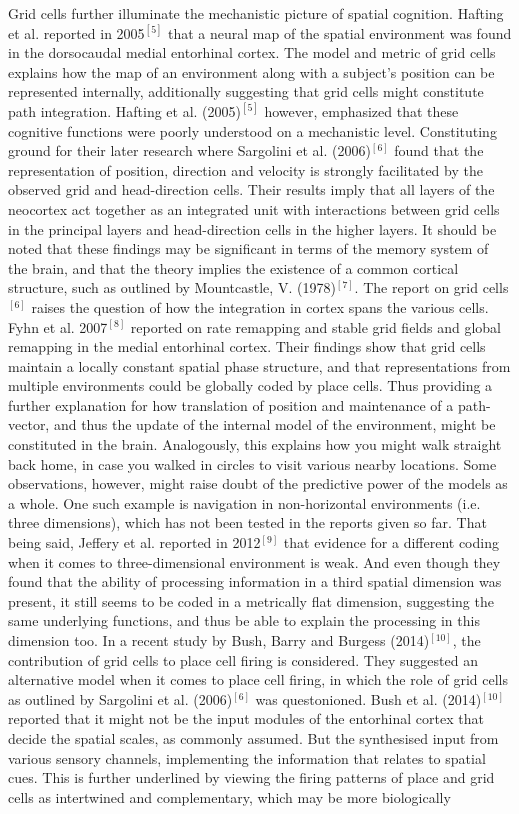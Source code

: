Grid cells further illuminate the mechanistic picture of spatial cognition. Hafting et al. reported in 2005$^{[5]}$ that a neural map of the spatial environment was found in the dorsocaudal medial entorhinal cortex. The model and metric of grid cells explains how the map of an environment along with a subject’s position can be represented internally, additionally suggesting that grid cells might constitute path integration. Hafting et al. (2005)$^{[5]}$ however, emphasized that these cognitive functions were poorly understood on a mechanistic level. Constituting ground for their later research where Sargolini et al. (2006)$^{[6]}$ found that the representation of position, direction and velocity is strongly facilitated by the observed grid and head-direction cells. Their results imply that all layers of the neocortex act together as an integrated unit with interactions between grid cells in the principal layers and head-direction cells in the higher layers. It should be noted that these findings may be significant in terms of the memory system of the brain, and that the theory implies the existence of a common cortical structure, such as outlined by Mountcastle, V. (1978)$^{[7]}$. The report on grid cells$^{[6]}$ raises the question of how the integration in cortex spans the various cells. Fyhn et al. 2007$^{[8]}$ reported on rate remapping and stable grid fields and global remapping in the medial entorhinal cortex. Their findings show that grid cells maintain a locally constant spatial phase structure, and that representations from multiple environments could be globally coded by place cells. Thus providing a further explanation for how translation of position and maintenance of a path-vector, and thus the update of the internal model of the environment, might be constituted in the brain. Analogously, this explains how you might walk straight back home, in case you walked in circles to visit various nearby locations. Some observations, however, might raise doubt of the predictive power of the models as a whole. One such example is navigation in non-horizontal environments (i.e. three dimensions), which has not been tested in the reports given so far. That being said, Jeffery et al. reported in 2012$^{[9]}$ that evidence for a different coding when it comes to three-dimensional environment is weak. And even though they found that the ability of processing information in a third spatial dimension was present, it still seems to be coded in a metrically flat dimension, suggesting the same underlying functions, and thus be able to explain the processing in this dimension too. In a recent study by Bush, Barry and Burgess (2014)$^{[10]}$, the contribution of grid cells to place cell firing is considered. They suggested an alternative model when it comes to place cell firing, in which the role of grid cells as outlined by Sargolini et al. (2006)$^{[6]}$ was questonioned. Bush et al. (2014)$^{[10]}$ reported that it might not be the input modules of the entorhinal cortex that decide the spatial scales, as commonly assumed. But the synthesised input from various sensory channels, implementing the information that relates to spatial cues. This is further underlined by viewing the firing patterns of place and grid cells as intertwined and complementary, which may be more biologically 